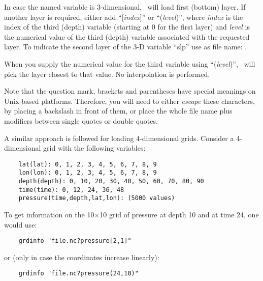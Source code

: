 In case the named variable is 3-dimensional, \GMT\ will load first (bottom) layer. If another
layer is required, either add ``[\emph{index}]'' or ``(\emph{level})'', where \emph{index} is
the index of the third (depth) variable (starting at 0 for the first layer) and \emph{level}
is the numerical value of the third (depth) variable associated with the requested layer.
To indicate the second layer of the 3-D variable ``slp'' use as file name: .

When you supply the numerical value for the third variable using ``(\emph{level})'',
\GMT\ will pick the layer closest to that value. No interpolation is performed.

Note that the question mark, brackets and parentheses have special meanings on Unix-based platforms. Therefore,
you will need to either \emph{escape} these characters, by placing a backslash in front of them, or place the
whole file name plus modifiers between single quotes or double quotes.

A similar approach is followed for loading 4-dimensional grids. Consider a 4-dimensional grid with the following
variables:
\begin{verbatim}
	lat(lat): 0, 1, 2, 3, 4, 5, 6, 7, 8, 9
	lon(lon): 0, 1, 2, 3, 4, 5, 6, 7, 8, 9
	depth(depth): 0, 10, 20, 30, 40, 50, 60, 70, 80, 90
	time(time): 0, 12, 24, 36, 48
	pressure(time,depth,lat,lon): (5000 values)
\end{verbatim}
To get information on the 10$\times$10 grid of pressure at depth 10 and at time 24, one would use:
\begin{verbatim}
	grdinfo "file.nc?pressure[2,1]"
\end{verbatim}
or (only in case the coordinates increase linearly):
\begin{verbatim}
	grdinfo "file.nc?pressure(24,10)"
\end{verbatim}

